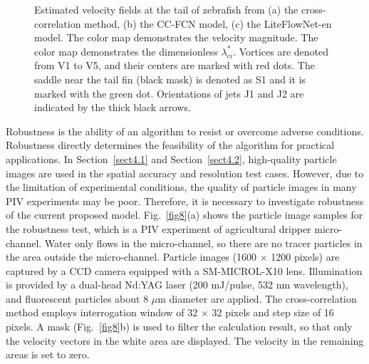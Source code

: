 \documentclass[%
 aip,
 amsmath,amssymb,
 reprint,%
]{revtex4-1}
\begin{document}
\begin{figure*}
	\begin{center}
		\caption{Estimated velocity fields at the tail of zebrafish from (a) the cross-correlation method, (b) the CC-FCN model, (c) the LiteFlowNet-en model. The color map demonstrates the velocity magnitude. The color map demonstrates the dimensionless $\lambda_{ci}^{\ast}$. Vortices are denoted from V1 to V5, and their centers are marked with red dots. The saddle near the tail fin (black mask) is denoted as S1 and it is marked with the green dot. Orientations of jets J1 and J2 are indicated by the thick black arrows.}
		\label{fig13}
	\end{center}
\end{figure*}

Robustness is the ability of an algorithm to resist or overcome adverse conditions.
Robustness directly determines the feasibility of the algorithm for practical applications.
In Section~\ref{sect4.1} and Section~\ref{sect4.2}, high-quality particle images are used in the spatial accuracy and resolution test cases.
However, due to the limitation of experimental conditions, the quality of particle images in many PIV experiments may be poor. 
Therefore, it is necessary to investigate robustness of the current proposed model. 
Fig.~\ref{fig8}(a) shows the particle image samples for the robustness test, which is a PIV experiment of agricultural dripper micro-channel. 
Water only flows in the micro-channel, so there are no tracer particles in the area outside the micro-channel.
Particle images (1600 $\times$ 1200 pixels) are captured by a CCD camera equipped with a SM-MICROL-X10 lens.
Illumination is provided by a dual-head
Nd:YAG laser (200 mJ/pulse, 532 nm wavelength), and fluorescent particles about 8 $\mu$m diameter are applied.
The cross-correlation method employs interrogation window of 32 $\times$ 32 pixels and step size of 16 pixels.
A mask (Fig.~\ref{fig8}b) is used to filter the calculation result, so that only the velocity vectors in the white area are displayed. The velocity in the remaining areas is set to zero.
\end{document}
